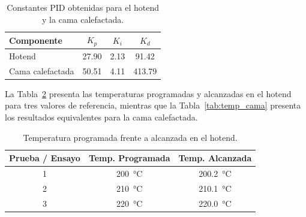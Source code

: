 \begin{table}[htbp]
    \centering
    \caption{Constantes PID obtenidas para el hotend y la cama calefactada.}
    \label{tab:pid_final}
    \begin{tabular}{lccc}
        \toprule
        \textbf{Componente} & \textbf{$K_p$} & 
        \textbf{$K_i$} & \textbf{$K_d$} \\
        \midrule
        Hotend        & 27.90 & 2.13 & 91.42 \\
        Cama calefactada & 50.51 & 4.11 & 413.79 \\
        \bottomrule
    \end{tabular}
\end{table}

%
% 
%
%


La Tabla~\ref{tab:temp_hotend} presenta las temperaturas programadas y 
alcanzadas en el hotend para tres valores de referencia, mientras que la 
Tabla~\ref{tab:temp_cama} presenta los resultados equivalentes para la cama 
calefactada.

\begin{table}[htbp]
    \centering
    \caption{Temperatura programada frente a alcanzada en el hotend.}
    \label{tab:temp_hotend}
    \begin{tabular}{ccc}
        \toprule
        \textbf{Prueba / Ensayo} & \textbf{Temp. Programada} & \textbf{Temp. Alcanzada} \\
        \midrule
        1 & \qty{200}{\celsius} & \qty{200.2}{\celsius} \\
        2 & \qty{210}{\celsius} & \qty{210.1}{\celsius} \\
        3 & \qty{220}{\celsius} & \qty{220.0}{\celsius} \\
        \bottomrule
    \end{tabular}
\end{table}

